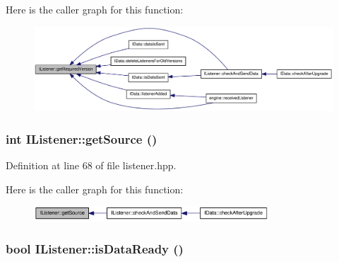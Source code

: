 Here is the caller graph for this function:\nopagebreak
\begin{figure}[H]
\begin{center}
\leavevmode
\includegraphics[width=379pt]{class_i_listener_aee2a0174f44139725e4e19fdc3c4d94e_icgraph}
\end{center}
\end{figure}
\hypertarget{class_i_listener_a52a8aa5ce8929ad9eae2a7c9c7cce9ba}{
\subsubsection[{getSource}]{\setlength{\rightskip}{0pt plus 5cm}int IListener::getSource ()}}
\label{class_i_listener_a52a8aa5ce8929ad9eae2a7c9c7cce9ba}


Definition at line 68 of file listener.hpp.

Here is the caller graph for this function:\nopagebreak
\begin{figure}[H]
\begin{center}
\leavevmode
\includegraphics[width=250pt]{class_i_listener_a52a8aa5ce8929ad9eae2a7c9c7cce9ba_icgraph}
\end{center}
\end{figure}
\hypertarget{class_i_listener_a2a9973fb9b26f21ee034d4ba0349e541}{
\subsubsection[{isDataReady}]{\setlength{\rightskip}{0pt plus 5cm}bool IListener::isDataReady ()}}
\label{class_i_listener_a2a9973fb9b26f21ee034d4ba0349e541}


